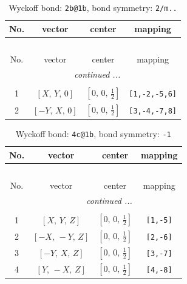\documentclass[fleqn,8pt]{jsarticle}
\begin{document}
\begin{longtable}{cccc}
\caption{Wyckoff bond: {\tt 2b@1b}, bond symmetry: {\tt 2/m..}}
 \\
 \hline \hline
No. & vector & center & mapping \\ \hline \endfirsthead

\multicolumn{3}{l}{\tablename\ \thetable{}} \\
 \hline \hline
No. & vector & center & mapping \\ \hline \endhead

 \hline \hline
\multicolumn{3}{r}{\footnotesize\it continued ...} \\ \endfoot

 \hline \hline
\multicolumn{3}{r}{} \\ \endlastfoot

1 & $\left[ X,\, Y,\, 0 \right]$ & $\left[ 0,\, 0,\, \frac{1}{2} \right]$ & {\tt [1,-2,-5,6]} \\ \hline
2 & $\left[ - Y,\, X,\, 0 \right]$ & $\left[ 0,\, 0,\, \frac{1}{2} \right]$ & {\tt [3,-4,-7,8]} \\
\end{longtable}
\renewcommand{\arraystretch}{1.2}
\begin{longtable}{cccc}
\caption{Wyckoff bond: {\tt 4c@1b}, bond symmetry: {\tt -1}}
 \\
 \hline \hline
No. & vector & center & mapping \\ \hline \endfirsthead

\multicolumn{3}{l}{\tablename\ \thetable{}} \\
 \hline \hline
No. & vector & center & mapping \\ \hline \endhead

 \hline \hline
\multicolumn{3}{r}{\footnotesize\it continued ...} \\ \endfoot

 \hline \hline
\multicolumn{3}{r}{} \\ \endlastfoot

1 & $\left[ X,\, Y,\, Z \right]$ & $\left[ 0,\, 0,\, \frac{1}{2} \right]$ & {\tt [1,-5]} \\ \hline
2 & $\left[ - X,\, - Y,\, Z \right]$ & $\left[ 0,\, 0,\, \frac{1}{2} \right]$ & {\tt [2,-6]} \\ \hline
3 & $\left[ - Y,\, X,\, Z \right]$ & $\left[ 0,\, 0,\, \frac{1}{2} \right]$ & {\tt [3,-7]} \\ \hline
4 & $\left[ Y,\, - X,\, Z \right]$ & $\left[ 0,\, 0,\, \frac{1}{2} \right]$ & {\tt [4,-8]} \\
\end{longtable}
\end{document}
